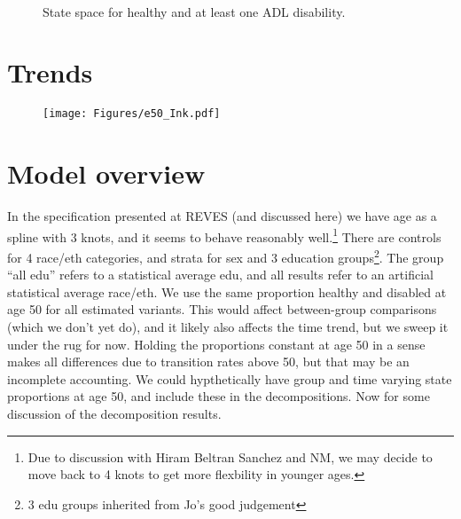 \begin{figure}[t!]\centering
{}\\

\caption{State space for healthy and at least one ADL disability.}\label{fig:statespace}
\end{figure}

\section{Trends}

\begin{figure}
\centering
\texttt{[image: Figures/e50\_Ink.pdf]}
\end{figure}

\section{Model overview}
 In the specification presented at REVES (and discussed here) we have age as a spline with 3 knots, and it seems to behave reasonably well.\footnote{Due to discussion with Hiram Beltran Sanchez and NM, we may decide to move back to 4 knots to get more flexbility in younger ages.} There are controls for 4 race/eth categories, and strata for sex and 3 education groups\footnote{3 edu groups inherited from Jo's good judgement}. The group ``all edu'' refers to a statistical average edu, and all results refer to an artificial statistical average race/eth. We use the same proportion healthy and disabled at age 50 for all estimated variants. This would affect between-group comparisons (which we don't yet do), and it likely also affects the time trend, but we sweep it under the rug for now. Holding the proportions constant at age 50 in a sense makes all differences due to transition rates above 50, but that may be an incomplete accounting. We could hypthetically have group and time varying state proportions at age 50, and include these in the decompositions. Now for some discussion of the decomposition results.


